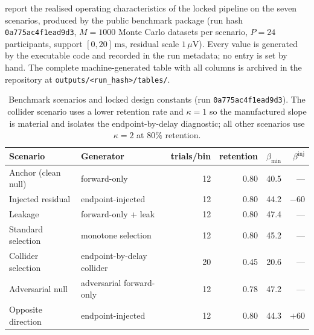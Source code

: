 \documentclass[11pt,a4paper]{article}
\theoremstyle{definition}
\begin{document}
 report the realised operating
characteristics of the locked pipeline on the seven scenarios, produced by the
public benchmark package (run hash \texttt{0a775ac4f1ead9d3}, \(M=1000\) Monte
Carlo datasets per scenario, \(P=24\) participants, support \([0,20]\,\mathrm{ms}\),
residual scale \(1\,\mu\mathrm{V}\)). Every value is generated by the executable
code and recorded in the run metadata; no entry is set by hand. The complete
machine-generated table with all columns is archived in the repository at
\texttt{outputs/<run\_hash>/tables/}.

\begin{table}[t]
\centering
\caption{Benchmark scenarios and locked design constants (run
\texttt{0a775ac4f1ead9d3}). The collider scenario uses a lower retention rate and
\(\kappa=1\) so the manufactured slope is material and isolates the
endpoint-by-delay diagnostic; all other scenarios use \(\kappa=2\) at \(80\%\)
retention.}
\label{tab:si-oc-design}
\footnotesize
\begin{tabular}{llrrrr}
\toprule
Scenario & Generator & trials/bin & retention & \(\beta_{\min}\) &
\(\beta^{\mathrm{inj}}\) \\
\midrule
Anchor (clean null) & forward-only & 12 & 0.80 & 40.5 & --- \\
Injected residual & endpoint-injected & 12 & 0.80 & 44.2 & \(-60\) \\
Leakage & forward-only + leak & 12 & 0.80 & 47.4 & --- \\
Standard selection & monotone selection & 12 & 0.80 & 45.2 & --- \\
Collider selection & endpoint-by-delay collider & 20 & 0.45 & 20.6 & --- \\
Adversarial null & adversarial forward-only & 12 & 0.78 & 47.2 & --- \\
Opposite direction & endpoint-injected & 12 & 0.80 & 44.3 & \(+60\) \\
\bottomrule
\end{tabular}
\end{table}
\end{document}
